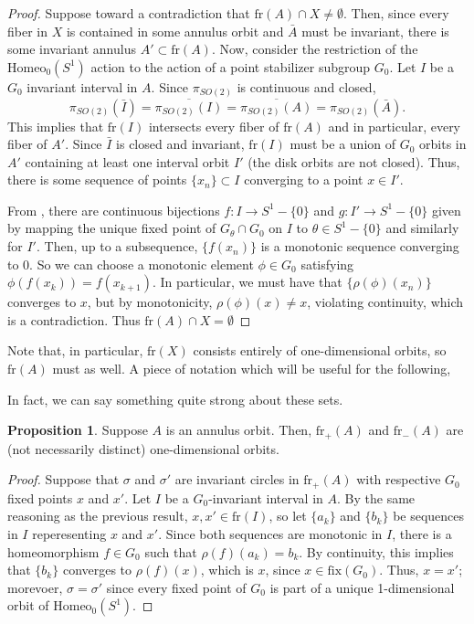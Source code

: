 \documentclass[10pt, oneside]{article}
\newcommand{\homeoS}{\text{Homeo}_0(S^1)}
\theoremstyle{definition}
\newtheorem{prop}{Proposition}
\theoremstyle{definition}
\begin{document}
\begin{proof}
    Suppose toward a contradiction that $\text{fr}(A)\cap X\neq \emptyset$. Then, since every fiber in $X$ is contained in some annulus orbit and $\bar{A}$ must be invariant, there is some invariant annulus $A'\subset \text{fr}(A)$. Now, consider the restriction of the $\homeoS$ action to the action of a point stabilizer subgroup $G_0$. Let $I$ be a $G_0$ invariant interval in $A$. Since $\pi_{SO(2)}$ is continuous and closed, $$\pi_{SO(2)}(\bar{I}) = \overline{\pi_{SO(2)}(I)} = \overline{\pi_{SO(2)}(A)} = \pi_{SO(2)}(\bar{A}).$$ This implies that $\text{fr}(I)$ intersects every fiber of $\text{fr}(A)$ and in particular, every fiber of $A'$. Since $\bar{I}$ is closed and invariant, $\text{fr}(I)$ must be a union of $G_0$ orbits in $A'$ containing at least one interval orbit $I'$ (the disk orbits are not closed). Thus, there is some sequence of points $\{x_n\}\subset I$ converging to a point $x\in I'$.


    From \cite{mann-chen}, there are continuous bijections $f:I\to S^1-\{0\}$ and $g:I'\to S^1-\{0\}$ given by mapping the unique fixed point of $G_\theta\cap G_0$ on $I$ to $\theta\in S^1 - \{0\}$ and similarly for $I'$. Then, up to a subsequence, $\{f(x_n)\}$ is a monotonic sequence converging to 0. So we can choose a monotonic element $\phi\in G_0$ satisfying $\phi(f(x_k)) = f(x_{k+1})$. In particular, we must have that $\{\rho(\phi)( x_n)\}$ converges to $x$, but by monotonicity, $\rho(\phi)(x) \neq x$, violating continuity, which is a contradiction. Thus $\text{fr}(A)\cap X = \emptyset$
\end{proof}

Note that, in particular, $\text{fr}(X)$ consists entirely of one-dimensional orbits, so $\text{fr}(A)$ must as well. A piece of notation which will be useful for the following,



In fact, we can say something quite strong about these sets.

\begin{prop}
    Suppose $A$ is an annulus orbit. Then, $\text{fr}_+(A)$ and $\text{fr}_-(A)$ are (not necessarily distinct) one-dimensional orbits.
\end{prop}

\begin{proof}
    Suppose that $\sigma$ and $\sigma'$ are invariant circles in $\text{fr}_+(A)$ with respective $G_0$ fixed points $x$ and $x'$. Let $I$ be a $G_0$-invariant interval in $A$. By the same reasoning as the previous result, $x, x'\in \text{fr}(I)$, so let $\{a_k\}$ and $\{b_k\}$ be sequences in $I$ reperesenting $x$ and $x'$. Since both sequences are monotonic in $I$, there is a homeomorphism $f\in G_0$ such that $\rho(f)(a_k) = b_k$. By continuity, this implies that $\{b_k\}$ converges to $\rho(f)(x)$, which is $x$, since $x\in\text{fix}(G_0)$. Thus, $x=x'$; morevoer, $\sigma = \sigma'$ since every fixed point of $G_0$ is part of a unique 1-dimensional orbit of $\homeoS$.
\end{proof}
\end{document}
